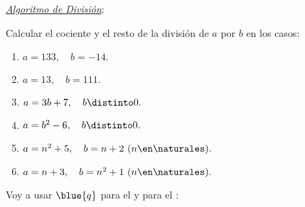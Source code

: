 \textit{\underline{Algoritmo de División}}:\par

\begin{enunciado}{\ejercicio}
  Calcular el cociente y el resto de la división de $a$ por $b$ en los casos:
  \begin{multicols}{2}
    \begin{enumerate}[label=\alph*)]
      \item $a =133,\quad b = -14.$
      \item $a =13,\quad b = 111.$
      \item $a =3b+7,    \quad b \distinto 0.$
      \item $a = b^2 - 6,\quad b \distinto 0.$
      \item $a = n^2 + 5,\quad b = n+2 \ (n \en \naturales).$
      \item $a = n + 3,   \quad b = n^2 + 1 \ (n \en \naturales).$
    \end{enumerate}
  \end{multicols}
\end{enunciado}

Voy a usar $\blue{q}$ para el  y  para el :


